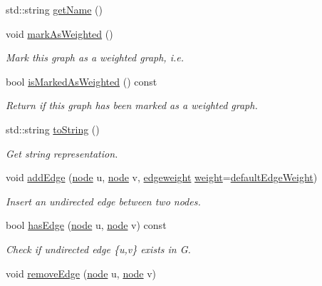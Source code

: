 \begin{DoxyCompactItemize}
std\-::string \hyperlink{class_networ_kit_1_1_graph_a51d60896a8ae08301cf6b2c0161f2c68}{get\-Name} ()
\item 
void \hyperlink{class_networ_kit_1_1_graph_ad1bfb48ba7fe445a5d3f257c912bbc83}{mark\-As\-Weighted} ()
\begin{DoxyCompactList}\small\item\em Mark this graph as a weighted graph, i.\-e. \end{DoxyCompactList}\item 
bool \hyperlink{class_networ_kit_1_1_graph_a1b460f550c6489930dad5d8614b35327}{is\-Marked\-As\-Weighted} () const 
\begin{DoxyCompactList}\small\item\em Return if this graph has been marked as a weighted graph. \end{DoxyCompactList}\item 
std\-::string \hyperlink{class_networ_kit_1_1_graph_a1ec9e68347696937a5d98d2b0bd610b3}{to\-String} ()
\begin{DoxyCompactList}\small\item\em Get string representation. \end{DoxyCompactList}\item 
void \hyperlink{class_networ_kit_1_1_graph_a238dc9601bd643dc909b0211d13b26f7}{add\-Edge} (\hyperlink{namespace_networ_kit_a53fe3e4fd04ea024160e4d024dfebadf}{node} u, \hyperlink{namespace_networ_kit_a53fe3e4fd04ea024160e4d024dfebadf}{node} v, \hyperlink{namespace_networ_kit_a831b108dbcd79dad062d9e28b1b4e3dd}{edgeweight} \hyperlink{class_networ_kit_1_1_graph_a4cc21c97791b60088e735ef0c36583b8}{weight}=\hyperlink{class_networ_kit_1_1_graph_af32663b9ad67bae546281e7725db3519}{default\-Edge\-Weight})
\begin{DoxyCompactList}\small\item\em Insert an undirected edge between two nodes. \end{DoxyCompactList}\item 
bool \hyperlink{class_networ_kit_1_1_graph_a7a646fd6745ba9e7528170ff237232eb}{has\-Edge} (\hyperlink{namespace_networ_kit_a53fe3e4fd04ea024160e4d024dfebadf}{node} u, \hyperlink{namespace_networ_kit_a53fe3e4fd04ea024160e4d024dfebadf}{node} v) const 
\begin{DoxyCompactList}\small\item\em Check if undirected edge \{u,v\} exists in G. \end{DoxyCompactList}\item 
void \hyperlink{class_networ_kit_1_1_graph_a79d74bd437bf63f866a9da4ba11f270c}{remove\-Edge} (\hyperlink{namespace_networ_kit_a53fe3e4fd04ea024160e4d024dfebadf}{node} u, \hyperlink{namespace_networ_kit_a53fe3e4fd04ea024160e4d024dfebadf}{node} v)

\end{DoxyCompactItemize}
